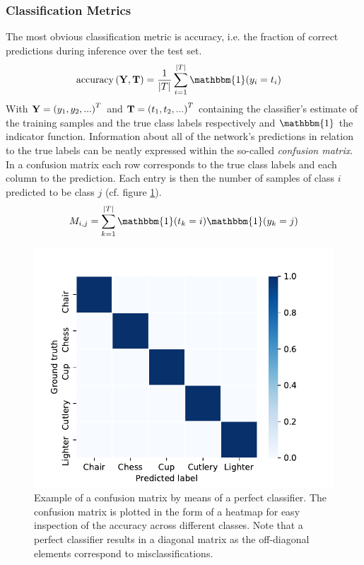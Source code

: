 \subsubsection{Classification Metrics}
The most obvious classification metric is accuracy, i.e. the fraction of correct predictions during inference over the test set.
\begin{align}
    \operatorname{accuracy}\qty(\vb{Y}, \vb{T}) &= \frac{1}{\abs{T}}\sum_{i=1}^{\abs{T}} \mathbbm{1}\qty(y_i=t_i)
\end{align}
With $\vb{Y}=\qty(y_1,y_2,...)^T$ and $\vb{T}=\qty(t_1,t_2,...)^T$ containing the classifier's estimate of the training samples and the true class labels respectively and $\mathbbm{1}$ the indicator function. Information about all of the network's predictions in relation to the true labels can be neatly expressed within the so-called \emph{confusion matrix}. In a confusion matrix each row corresponds to the true class labels and each column to the prediction. Each entry is then the number of samples of class $i$ predicted to be class $j$ (cf. figure \ref{fig:confusion}).
\begin{align}
    M_{i,j} = \sum_{k=1}^{\abs{T}}\mathbbm{1}\qty(t_k = i)\mathbbm{1}\qty(y_k = j)
\end{align}
\begin{figure}[H]
    \centering
\includegraphics[clip,trim=0 0 0 1.1cm,width=.75\textwidth]{figures/confusion_matrix.pdf}
\caption[Example of a confusion matrix by means of a perfect classifier]{Example of a confusion matrix by means of a perfect classifier. The confusion matrix is plotted in the form of a heatmap for easy inspection of the accuracy across different classes. Note that a perfect classifier results in a diagonal matrix as the off-diagonal elements correspond to misclassifications.}\label{fig:confusion}
\end{figure}\noindent
